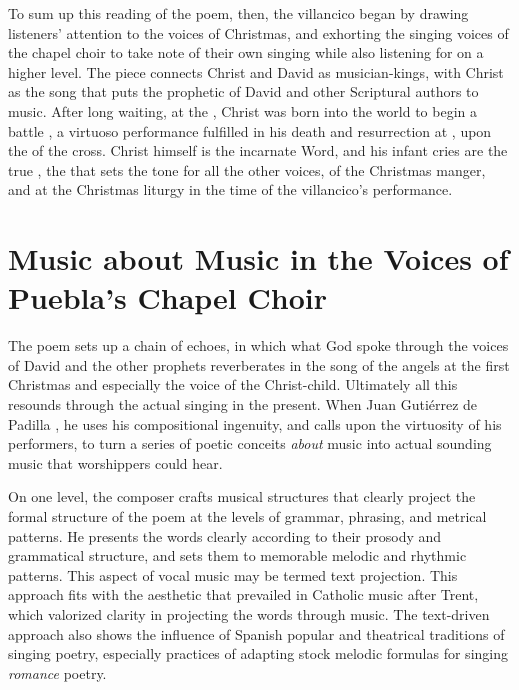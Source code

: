 To sum up this reading of the poem, then, the villancico began by drawing
listeners' attention to the voices of Christmas, and exhorting the singing
voices of the chapel choir to take note of their own singing while also
listening for  on a higher level.
The piece connects Christ and David as musician-kings, with Christ as the song
that puts the prophetic  of David and other Scriptural authors to
music.
After long waiting, at the , Christ was born into the
world to begin a battle , a virtuoso performance fulfilled in
his death and resurrection at , upon the 
of the cross.
Christ himself is the incarnate Word, and his infant cries are the true
, the  that sets the tone for all the other
voices,  of the Christmas manger, and at the
Christmas liturgy in the time of the villancico's performance.

\section{Music about Music in the Voices of Puebla's Chapel Choir}

The poem sets up a chain of echoes, in which what God spoke through the voices
of David and the other prophets reverberates in the song of the angels at the
first Christmas and especially the voice of the Christ-child. 
Ultimately all this resounds through the actual  singing in the present.
When Juan Gutiérrez de Padilla , he uses his
compositional ingenuity, and calls upon the virtuosity of his performers, to
turn a series of poetic conceits \emph{about} music into actual sounding music
that worshippers could hear.

On one level, the composer crafts musical structures that clearly project the
formal structure of the poem at the levels of grammar, phrasing, and metrical
patterns.
He presents the words clearly according to their prosody and grammatical
structure, and sets them to memorable melodic and rhythmic patterns.
This aspect of vocal music may be termed text projection.
This approach fits with the aesthetic that prevailed in Catholic music after
Trent, which valorized clarity in projecting the words through music.
The text-driven approach also shows the influence of Spanish popular and
theatrical traditions of singing poetry, especially practices of adapting stock
melodic formulas for singing \emph{romance} poetry.

